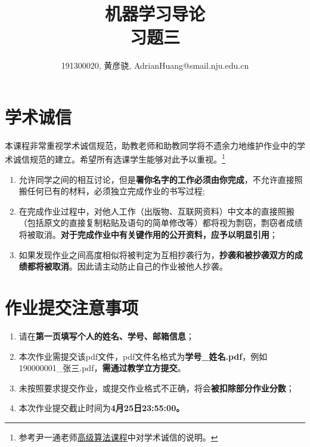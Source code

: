 \documentclass[a4paper,UTF8]{article}
\theoremstyle{definition}
\begin{document}
\title{机器学习导论\\
	习题三}
\author{191300020, 黄彦骁, AdrianHuang@smail.nju.edu.cn}
\maketitle


\section*{学术诚信}

本课程非常重视学术诚信规范，助教老师和助教同学将不遗余力地维护作业中的学术诚信规范的建立。希望所有选课学生能够对此予以重视。\footnote{参考尹一通老师\href{http://tcs.nju.edu.cn/wiki/}{高级算法课程}中对学术诚信的说明。}

\begin{tcolorbox}
	\begin{enumerate}[(1)]
		\item 允许同学之间的相互讨论，但是{\color{red}\textbf{署你名字的工作必须由你完成}}，不允许直接照搬任何已有的材料，必须独立完成作业的书写过程;
		\item 在完成作业过程中，对他人工作（出版物、互联网资料）中文本的直接照搬（包括原文的直接复制粘贴及语句的简单修改等）都将视为剽窃，剽窃者成绩将被取消。{\color{red}\textbf{对于完成作业中有关键作用的公开资料，应予以明显引用}}；
		\item 如果发现作业之间高度相似将被判定为互相抄袭行为，{\color{red}\textbf{抄袭和被抄袭双方的成绩都将被取消}}。因此请主动防止自己的作业被他人抄袭。
	\end{enumerate}
\end{tcolorbox}

\section*{作业提交注意事项}
\begin{tcolorbox}
	\begin{enumerate}[(1)]
		\item 请在{\color{red}\textbf{第一页填写个人的姓名、学号、邮箱信息}}；
		\item 本次作业需提交该pdf文件，pdf文件名格式为{\color{red}\textbf{学号\_姓名.pdf}}，例如190000001\_张三.pdf，{\color{red}\textbf{需通过教学立方提交}}。
		\item 未按照要求提交作业，或提交作业格式不正确，将会{\color{red}\textbf{被扣除部分作业分数}}；
		\item 本次作业提交截止时间为{\color{red}\textbf{4月25日23:55:00。}}
	\end{enumerate}
\end{tcolorbox}
\end{document}

